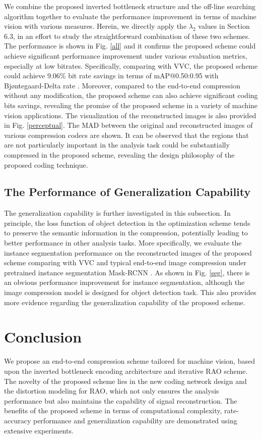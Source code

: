 \documentclass[transmag]{IEEEtran}
\begin{document}
We combine the proposed inverted bottleneck structure and the off-line searching algorithm together to evaluate the performance improvement in terms of machine vision with various measures. Herein, we directly apply the $\lambda_{2}$ values in Section 6.3, in an effort to study the straightforward combination of these two schemes.
The performance is shown in Fig. \ref{all} and it confirms the proposed scheme could achieve significant performance improvement under various evaluation metrics, especially at low bitrates. Specifically, comparing with VVC, the proposed scheme could achieve 9.06\% bit rate savings in terms of mAP@0.50:0.95 with Bj\o ntegaard-Delta rate \cite{vcmbdrate}. Moreover, compared to the end-to-end compression without any modification, the proposed scheme can also achieve significant coding bits savings, revealing the promise of the proposed scheme in a variety of machine vision applications. {The visualization of the reconstructed images is also provided in Fig. \ref{perceptual}. The MAD between the original and reconstructed images of various compression codecs are 
shown. It can be observed that the regions that are not particularly important in the analysis task could be substantially compressed in the proposed scheme, revealing the design philosophy of the proposed coding technique.}

\subsection{The Performance of Generalization Capability}
The generalization capability is further investigated in this subsection. In principle, the loss function of object detection in the optimization scheme tends to preserve the semantic information in the compression, potentially leading to better performance in other analysis tasks. More specifically, we evaluate the instance segmentation performance on the reconstructed images of the proposed scheme comparing with VVC and typical end-to-end image compression \cite{minnen2018joint} under pretrained instance segmentation Mask-RCNN \cite{wu2019detectron2}. As shown in Fig. \ref{seg}, there is an obvious performance improvement for instance segmentation, although the image compression model is designed for object detection task. This also provides more evidence regarding the generalization capability 
of the proposed scheme.


\section{Conclusion}
We propose an end-to-end compression scheme tailored for machine vision, based upon the inverted bottleneck encoding architecture 
and iterative RAO scheme. The novelty of the proposed scheme lies in the new coding network design and the distortion modeling for RAO, which not only ensures the analysis performance but also maintains the capability of signal reconstruction. The benefits of the proposed scheme in terms of computational complexity, rate-accuracy performance and generalization capability are demonstrated using extensive experiments. 
\end{document}
